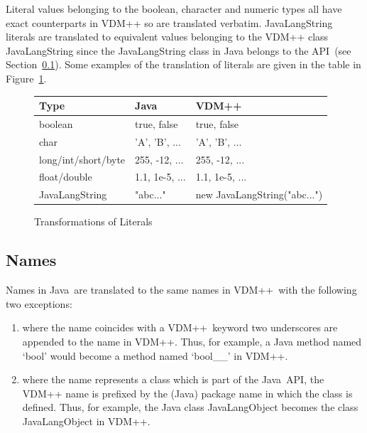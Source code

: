 \documentclass[\pformat,12pt]{article}
\newcommand{\vdmslpp}{VDM++}
\newcommand{\JAVA}{Java}
\newcommand{\VDM}{VDM++}
\begin{document}
Literal values belonging to the boolean, character and numeric types
all have exact counterparts in VDM++ so are translated
verbatim. JavaLangString literals are translated to equivalent values
belonging to the VDM++ class JavaLangString since the JavaLangString class in
Java belongs to the API~(see Section~\ref{names}). Some
examples of the translation of literals are given in
the table in Figure~\ref{fig:litxfs}.  

\begin{figure}[htbp]
  \begin{center}
\begin{longtable}{|l|l|l|}
\hline
Type &  \JAVA\   & \VDM\ \\ \hline \hline
  boolean   & true, false  & true, false   \\ \hline
  char      & 'A', 'B', ...    & 'A', 'B', ...  \\ \hline
  long/int/short/byte  & 255, -12, ...  & 255, -12, ...    \\ \hline
  float/double  & 1.1, 1e-5, ...  & 1.1, 1e-5, ...  \\ \hline
  JavaLangString    & "abc..."  & new JavaLangString("abc...") \\ \hline
\end{longtable}    
    \caption{Transformations of Literals}
    \label{fig:litxfs}
  \end{center}
\end{figure}



\subsection{Names}\label{names}

Names in \JAVA\ are translated to the same names in \vdmslpp\ with the
following two exceptions:

\begin{enumerate}
\item where the name coincides with a \VDM\ keyword two underscores
  are appended to the name in \VDM. Thus, for example, a Java method
  named `bool' would become a method named `bool\_\_' in VDM++. 
\item where the name represents a class which is part of the \JAVA\
  API, the VDM++ name is prefixed by the (Java) package name in which
  the class is defined. Thus, for example, the Java class JavaLangObject
  becomes the class JavaLangObject in VDM++. 
\end{enumerate}
\end{document}

